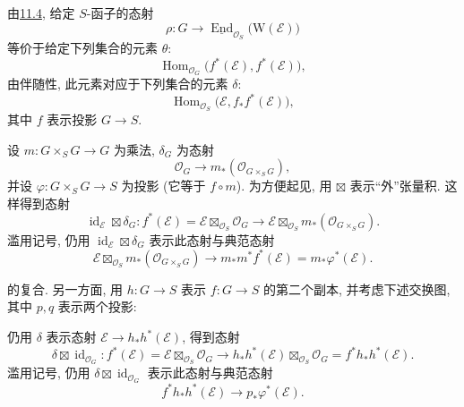 由\hyperref[par:sga3-VIB-11.4]{11.4}, 给定 \(S\)-函子的态射
\[
  \rho:G\longrightarrow
  \underline{\operatorname{End}}_{\mathcal O_S}
    \bigl(\mathrm W(\mathcal E)\bigr)
\]
等价于给定下列集合的元素 \(\theta\):
\[
  \operatorname{Hom}_{\mathcal O_G}
    \bigl(f^*(\mathcal E),f^*(\mathcal E)\bigr),
\]
由伴随性, 此元素对应于下列集合的元素 \(\delta\):
\[
  \operatorname{Hom}_{\mathcal O_S}
    \bigl(\mathcal E,f_*f^*(\mathcal E)\bigr),
\]
其中 \(f\) 表示投影 \(G\to S\).

设 \(m:G\times_SG\to G\) 为乘法, \(\delta_G\) 为态射
\[
  \mathcal O_G\longrightarrow
  m_*(\mathcal O_{G\times_SG}),
\]
并设 \(\varphi:G\times_SG\to S\) 为投影
\textup{(它等于 \(f\circ m\))}.
为方便起见, 用 \(\boxtimes\) 表示``外''张量积. 这样得到态射
\label{form:sga3-VIB-11.6-id-deltaG}%
\[
  \operatorname{id}_{\mathcal E}\boxtimes\delta_G:
  f^*(\mathcal E)
    =\mathcal E\boxtimes_{\mathcal O_S}\mathcal O_G
  \longrightarrow
  \mathcal E\boxtimes_{\mathcal O_S}
    m_*(\mathcal O_{G\times_SG}).
\]
滥用记号, 仍用 \(\operatorname{id}_{\mathcal E}\boxtimes\delta_G\)
表示此态射与典范态射
\[
  \mathcal E\boxtimes_{\mathcal O_S}
    m_*(\mathcal O_{G\times_SG})
  \longrightarrow
  m_*m^*f^*(\mathcal E)
  =m_*\varphi^*(\mathcal E).
\]

的复合. 另一方面, 用 \(h:G\to S\) 表示 \(f:G\to S\) 的第二个副本,
并考虑下述交换图, 其中 \(p,q\) 表示两个投影:
\begin{center}
  \label{diag:sga3-VIB-11.6-projections}%
\end{center}
仍用 \(\delta\) 表示态射 \(\mathcal E\to h_*h^*(\mathcal E)\), 得到态射
\label{form:sga3-VIB-11.6-delta-id}%
\[
  \delta\boxtimes\operatorname{id}_{\mathcal O_G}:
  f^*(\mathcal E)
    =\mathcal E\boxtimes_{\mathcal O_S}\mathcal O_G
  \longrightarrow
  h_*h^*(\mathcal E)\boxtimes_{\mathcal O_S}\mathcal O_G
    =f^*h_*h^*(\mathcal E).
\]
滥用记号, 仍用 \(\delta\boxtimes\operatorname{id}_{\mathcal O_G}\)
表示此态射与典范态射
\[
  f^*h_*h^*(\mathcal E)\longrightarrow
  p_*\varphi^*(\mathcal E).
\]

